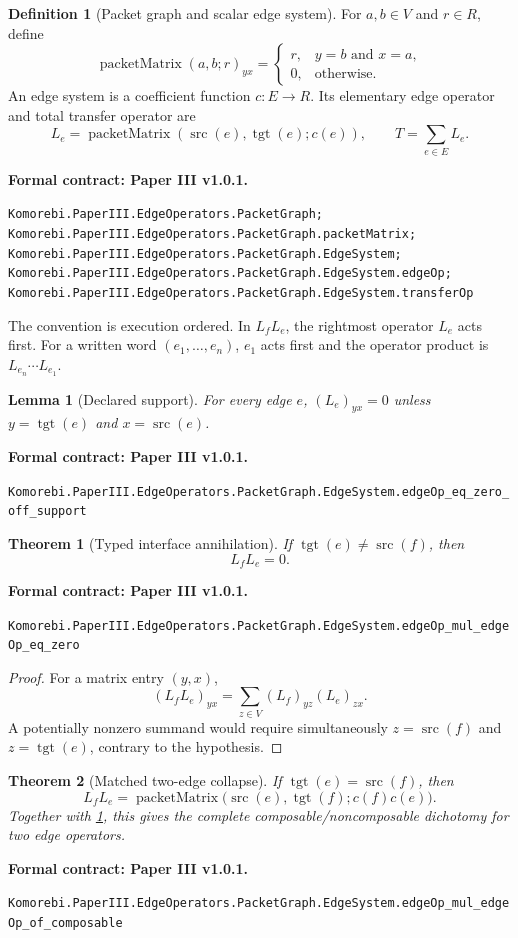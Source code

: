 \documentclass[11pt,a4paper]{article}
\newtheorem{theorem}{Theorem}[section]
\theoremstyle{plain}
\newtheorem{lemma}[lemma]{Lemma}
\theoremstyle{definition}
\newtheorem{definition}[definition]{Definition}
\theoremstyle{remark}
\newcommand{\src}{\operatorname{src}}
\newcommand{\tgt}{\operatorname{tgt}}
\newcommand{\leanname}[1]{\nolinkurl{#1}}
\newcommand{\statusleanthree}[1]{\par\smallskip\noindent\begin{minipage}{\linewidth}{\color{leanblue}\textbf{Formal contract: Paper III v1.0.1.}}\par\begingroup\small\raggedright\leanname{#1}\par\endgroup\end{minipage}\par\smallskip}
\begin{document}
\begin{definition}[Packet graph and scalar edge system]
\label{def:edge-system}
For $a,b\in V$ and $r\in R$, define
\[
  \operatorname{packetMatrix}(a,b;r)_{yx}
  =
  \begin{cases}
  r,&y=b\text{ and }x=a,\\
  0,&\text{otherwise}.
  \end{cases}
\]
An edge system is a coefficient function $c:E\to R$.  Its elementary edge
operator and total transfer operator are
\[
  L_e=\operatorname{packetMatrix}(\src(e),\tgt(e);c(e)),
  \qquad
  T=\sum_{e\in E}L_e.
\]
\end{definition}
\statusleanthree{Komorebi.PaperIII.EdgeOperators.PacketGraph; Komorebi.PaperIII.EdgeOperators.PacketGraph.packetMatrix; Komorebi.PaperIII.EdgeOperators.PacketGraph.EdgeSystem; Komorebi.PaperIII.EdgeOperators.PacketGraph.EdgeSystem.edgeOp; Komorebi.PaperIII.EdgeOperators.PacketGraph.EdgeSystem.transferOp}

The convention is execution ordered.  In $L_fL_e$, the rightmost operator
$L_e$ acts first.  For a written word $(e_1,\ldots,e_n)$, $e_1$ acts first
and the operator product is $L_{e_n}\cdots L_{e_1}$.

\begin{lemma}[Declared support]
\label{lem:edge-support}
For every edge $e$, $(L_e)_{yx}=0$ unless
$y=\tgt(e)$ and $x=\src(e)$.
\end{lemma}
\statusleanthree{Komorebi.PaperIII.EdgeOperators.PacketGraph.EdgeSystem.edgeOp_eq_zero_off_support}

\begin{theorem}[Typed interface annihilation]
\label{thm:edge-annihilation}
If $\tgt(e)\ne\src(f)$, then
\[
  L_fL_e=0.
\]
\end{theorem}
\statusleanthree{Komorebi.PaperIII.EdgeOperators.PacketGraph.EdgeSystem.edgeOp_mul_edgeOp_eq_zero}

\begin{proof}
For a matrix entry $(y,x)$,
\[
  (L_fL_e)_{yx}=\sum_{z\in V}(L_f)_{yz}(L_e)_{zx}.
\]
A potentially nonzero summand would require simultaneously
$z=\src(f)$ and $z=\tgt(e)$, contrary to the hypothesis.
\end{proof}

\begin{theorem}[Matched two-edge collapse]
\label{thm:edge-composable}
If $\tgt(e)=\src(f)$, then
\[
L_fL_e
=
\operatorname{packetMatrix}
\bigl(\src(e),\tgt(f);c(f)c(e)\bigr).
\]
Together with \cref{thm:edge-annihilation}, this gives the complete
composable/noncomposable dichotomy for two edge operators.
\end{theorem}
\statusleanthree{Komorebi.PaperIII.EdgeOperators.PacketGraph.EdgeSystem.edgeOp_mul_edgeOp_of_composable}
\end{document}
